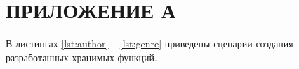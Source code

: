\section*{ПРИЛОЖЕНИЕ А}

В листингах \ref{lst:author} -- \ref{lst:genre} приведены сценарии создания разработанных хранимых функций.

\pagebreak